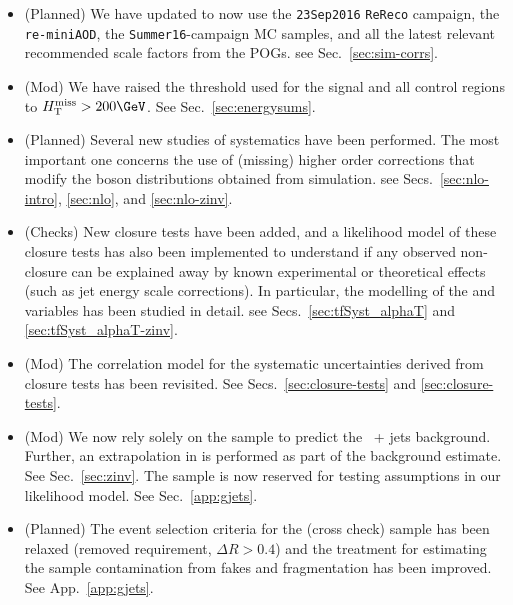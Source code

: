 \begin{itemize}
  
\item (Planned) We have updated to now use the \verb!23Sep2016!
  \verb!ReReco! campaign, the \verb!re-miniAOD!, the
  \verb!Summer16!-campaign MC samples, and all the latest relevant
  recommended scale factors from the POGs. \eg see
  Sec.~\ref{sec:sim-corrs}.
  
\item (Mod) We have raised the \HTmiss threshold used for the signal
  and all control regions to $\HTmiss > 200\GeV$. See
  Sec.~\ref{sec:energysums}.
    
\item (Planned) Several new studies of systematics have been
  performed. The most important one concerns the use of (missing)
  higher order corrections that modify the boson \Pt distributions
  obtained from simulation. \eg see Secs.~\ref{sec:nlo-intro},
  \ref{sec:nlo}, and \ref{sec:nlo-zinv}.

\item (Checks) New closure tests have been added, and a likelihood
  model of these closure tests has also been implemented to understand
  if any observed non-closure can be explained away by known
  experimental or theoretical effects (such as jet energy scale
  corrections). In particular, the modelling of the \alphat and \bdphi
  variables has been studied in detail. \eg see
  Secs.~\ref{sec:tfSyst_alphaT} and \ref{sec:tfSyst_alphaT-zinv}.

\item (Mod) The correlation model for the systematic uncertainties
  derived from closure tests has been revisited. See
  Secs.~\ref{sec:closure-tests} and \ref{sec:closure-tests}.


\item (Mod) We now rely solely on the \mmj sample to predict the
  \znunu\ + jets background. Further, an extrapolation in \nb is
  performed as part of the \znunuj background estimate. See
  Sec.~\ref{sec:zinv}. The \gj sample is now reserved for testing
  assumptions in our likelihood model. See Sec.~\ref{app:gjets}.

\item (Planned) The event selection criteria for the \gj (cross check)
  sample has been relaxed (removed \alphat requirement, $\Delta R >
  0.4$) and the treatment for estimating the sample contamination from
  fakes and fragmentation has been improved. See App.~\ref{app:gjets}.

\end{itemize}

